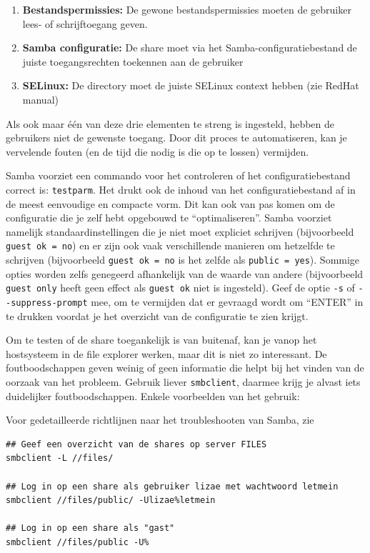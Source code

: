 \begin{enumerate}
\def\labelenumi{\arabic{enumi}.}
\item \textbf{Bestandspermissies:} De gewone bestandspermissies moeten de gebruiker lees- of schrijftoegang geven.
\item \textbf{Samba configuratie:} De share moet via het Samba-configuratiebestand  de juiste toegangsrechten toekennen aan de gebruiker
\item \textbf{SELinux:} De directory moet de juiste SELinux context hebben (zie RedHat manual)
\end{enumerate}

Als ook maar één van deze drie elementen te streng is ingesteld, hebben de gebruikers niet de gewenste toegang. Door dit proces te automatiseren, kan je vervelende fouten (en de tijd die nodig is die op te lossen) vermijden.

Samba voorziet een commando voor het controleren of het configuratiebestand  correct is: \texttt{testparm}. Het drukt ook de inhoud van het configuratiebestand af in de meest eenvoudige en compacte vorm. Dit kan ook van pas komen om de configuratie die je zelf hebt opgebouwd te ``optimaliseren''. Samba voorziet namelijk standaardinstellingen die je niet moet expliciet schrijven (bijvoorbeeld \texttt{guest\ ok\ =\ no}) en er zijn ook vaak verschillende manieren om hetzelfde te schrijven (bijvoorbeeld \texttt{guest\ ok\ =\ no} is het zelfde als \texttt{public\ =\ yes}). Sommige opties worden zelfs genegeerd afhankelijk van de waarde van andere (bijvoorbeeld \texttt{guest\ only} heeft geen effect als \texttt{guest\ ok} niet is ingesteld). Geef de optie \texttt{-s} of \texttt{-\/-suppress-prompt} mee, om te vermijden dat er gevraagd wordt om ``ENTER'' in te drukken voordat je het overzicht van de configuratie te zien krijgt.

Om te testen of de share toegankelijk is van buitenaf, kan je vanop het hostsysteem in de file explorer werken, maar dit is niet zo interessant.  De foutboodschappen geven weinig of geen informatie die helpt bij het vinden van de oorzaak van het probleem. Gebruik liever \texttt{smbclient}, daarmee krijg je alvast iets duidelijker foutboodschappen. Enkele voorbeelden van het gebruik:

Voor gedetailleerde richtlijnen naar het troubleshooten van Samba, zie~\textcite{TrigdellEtAl2010,CarterEtAl2010}

\begin{verbatim}
## Geef een overzicht van de shares op server FILES
smbclient -L //files/

## Log in op een share als gebruiker lizae met wachtwoord letmein
smbclient //files/public/ -Ulizae%letmein

## Log in op een share als "gast"
smbclient //files/public -U%
\end{verbatim}

